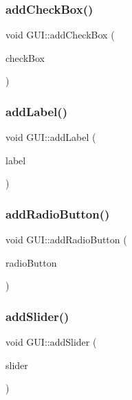 \mbox{\label{class_g_u_i_a9c003774928d3d6febd78713a0ef5943}} 
\subsubsection{\texorpdfstring{addCheckBox()}{addCheckBox()}}
{\footnotesize\ttfamily void G\+U\+I\+::add\+Check\+Box (\begin{DoxyParamCaption}\item[{\mbox{\hyperlink{class_check_box}{Check\+Box}} $\ast$}]{check\+Box }\end{DoxyParamCaption})}

\mbox{\label{class_g_u_i_a350e1e71e62bbb7240c7b1c65adeacf2}} 
\subsubsection{\texorpdfstring{addLabel()}{addLabel()}}
{\footnotesize\ttfamily void G\+U\+I\+::add\+Label (\begin{DoxyParamCaption}\item[{\mbox{\hyperlink{class_label}{Label}} $\ast$}]{label }\end{DoxyParamCaption})}

\mbox{\label{class_g_u_i_ab593b74382f085b7d24f6da0646ed534}} 
\subsubsection{\texorpdfstring{addRadioButton()}{addRadioButton()}}
{\footnotesize\ttfamily void G\+U\+I\+::add\+Radio\+Button (\begin{DoxyParamCaption}\item[{\mbox{\hyperlink{class_radio_button}{Radio\+Button}} $\ast$}]{radio\+Button }\end{DoxyParamCaption})}

\mbox{\label{class_g_u_i_a8fdf8aacbebf66678dc32ab8fb75e35e}} 
\subsubsection{\texorpdfstring{addSlider()}{addSlider()}}
{\footnotesize\ttfamily void G\+U\+I\+::add\+Slider (\begin{DoxyParamCaption}\item[{\mbox{\hyperlink{class_slider}{Slider}} $\ast$}]{slider }\end{DoxyParamCaption})}

